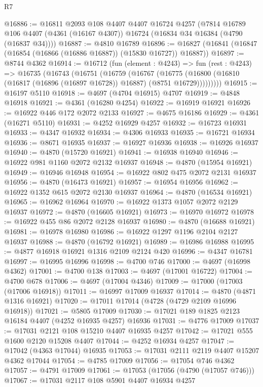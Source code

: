\begin{lexlean}{R7}
\begin{coremodule}
@16886 := @16811
    @2093
    @108
    @4407
    @4407
    @16724
    @4257
    (@7814 @16789 @106 @4407 (@4361 (@16167 @4307)) @16724 (@16834 @34 @16384 (@4790 (@16837 @34))))
@16887 := @4810 @16789
@16896 := @16827 (@16841 (@16847 (@16854 (@16866 (@16886 @16887)) (@15830 @16727)) @16887))
@16897 := @8744 @4362
@16914 := @16712
    (fun (element : @4243) =>
    fun (rest : @4243) =>
    @16735
      (@16743
        (@16751
          (@16759
            (@16767
              (@16775
                (@16800 (@16810 (@16817 (@16896 (@16897 @16728)) @16887) (@8751 @16729)))))))))
@16915 := @16197 @5110
@16918 := @4697 (@4704 @16915) @4707
@16919 := @4848 @16918
@16921 := @4361 (@16280 @4254)
@16922 := @16919 @16921
@16926 := @16922 @446 @172 @2072 @2133
@16927 := @4675 @16186
@16929 := @4361 (@16271 @5110)
@16931 := @4252 @16929 @4257
@16932 := @16723 @16931
@16933 := @4347 @16932
@16934 := @4306 @16933
@16935 := @16721 @16934
@16936 := @8671 @16935
@16937 := @16927 @16936
@16938 := @16926 @16937
@16940 := @4870 (@15720 @16921)
@16941 := @16938 @16940
@16946 := @16922 @981 @1160 @2072 @2132 @16937
@16948 := @4870 (@15954 @16921)
@16949 := @16946 @16948
@16954 := @16922 @802 @475 @2072 @2131 @16937
@16956 := @4870 (@16473 @16921)
@16957 := @16954 @16956
@16962 := @16922 @1352 @615 @2072 @2130 @16937
@16964 := @4870 (@16534 @16921)
@16965 := @16962 @16964
@16970 := @16922 @1373 @1057 @2072 @2129 @16937
@16972 := @4870 (@16605 @16921)
@16973 := @16970 @16972
@16978 := @16922 @455 @86 @2072 @2128 @16937
@16980 := @4870 (@16688 @16921)
@16981 := @16978 @16980
@16986 := @16922 @1297 @1196 @2104 @2127 @16937
@16988 := @4870 (@16792 @16921)
@16989 := @16986 @16988
@16995 := @4877 @16918 @16921 @1316 @2109 @2124 @420
@16996 := @4347 @16781
@16997 := @16995 @16996
@16998 := @4700 @746
@17000 := @4697 (@16998 @4362)
@17001 := @4700 @138
@17003 := @4697 (@17001 @16722)
@17004 := @4700 @678
@17006 := @4697 (@17004 @4346)
@17009 := @17000 (@17003 (@17006 @16918))
@17011 := @16997 @17009 @16937
@17014 := @4870 (@4871 @1316 @16921)
@17020 := @17011 @17014 (@4728 (@4729 @2109 @16996 @16918))
@17021 := @5805 @17009
@17030 := @17021 @189 @1825 @2123 @16184 @4407 (@4252 @16935 @4257) @16936
@17031 := @4776 @17009
@17037 := @17031 @2121 @108 @15210 @4407 @16935 @4257
@17042 := @17021 @555 @1600 @2120 @15208 @4407
@17044 := @4252 @16934 @4257
@17047 := @17042 (@4363 @17044) @16935
@17053 := @17031 @2111 @2119 @4407 @15207 @4362 @17044
@17054 := @4785 @17009
@17056 := @17054 @746 @4362
@17057 := @4791 @17009
@17061 := @17053 (@17056 (@4790 (@17057 @746)))
@17067 := @17031 @2117 @108 @5901 @4407 @16934 @4257

\end{coremodule}
\end{lexlean}
